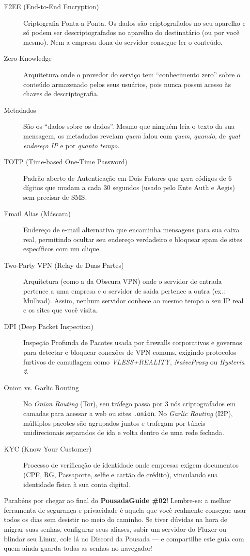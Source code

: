 \documentclass{pousadaguide}
\begin{document}
\begin{description}
  \item[E2EE (End-to-End Encryption)] Criptografia Ponta-a-Ponta. Os dados são criptografados no seu aparelho e só podem ser descriptografados no aparelho do destinatário (ou por você mesmo). Nem a empresa dona do servidor consegue ler o conteúdo.
  \item[Zero-Knowledge] Arquitetura onde o provedor do serviço tem ``conhecimento zero'' sobre o conteúdo armazenado pelos seus usuários, pois nunca possui acesso às chaves de descriptografia.
  \item[Metadados] São os ``dados sobre os dados''. Mesmo que ninguém leia o texto da sua mensagem, os metadados revelam \emph{quem} falou com \emph{quem}, \emph{quando}, de \emph{qual endereço IP} e por \emph{quanto tempo}.
  \item[TOTP (Time-based One-Time Password)] Padrão aberto de Autenticação em Dois Fatores que gera códigos de 6 dígitos que mudam a cada 30 segundos (usado pelo Ente Auth e Aegis) sem precisar de SMS.
  \item[Email Alias (Máscara)] Endereço de e-mail alternativo que encaminha mensagens para sua caixa real, permitindo ocultar seu endereço verdadeiro e bloquear spam de sites específicos com um clique.
  \item[Two-Party VPN (Relay de Duas Partes)] Arquitetura (como a da Obscura VPN) onde o servidor de entrada pertence a uma empresa e o servidor de saída pertence a outra (ex.: Mullvad). Assim, nenhum servidor conhece ao mesmo tempo o seu IP real e os sites que você visita.
  \item[DPI (Deep Packet Inspection)] Inspeção Profunda de Pacotes usada por firewalls corporativos e governos para detectar e bloquear conexões de VPN comuns, exigindo protocolos furtivos de camuflagem como \emph{VLESS+REALITY}, \emph{NaiveProxy} ou \emph{Hysteria 2}.
  \item[Onion vs. Garlic Routing] No \emph{Onion Routing} (Tor), seu tráfego passa por 3 nós criptografados em camadas para acessar a web ou sites \texttt{.onion}. No \emph{Garlic Routing} (I2P), múltiplos pacotes são agrupados juntos e trafegam por túneis unidirecionais separados de ida e volta dentro de uma rede fechada.
  \item[KYC (Know Your Customer)] Processo de verificação de identidade onde empresas exigem documentos (CPF, RG, Passaporte, selfie e cartão de crédito), vinculando sua identidade física à sua conta digital.
\end{description}

\divisor

\begin{pousadinha}
Parabéns por chegar ao final do \textbf{PousadaGuide \#02}! Lembre-se: a melhor ferramenta de segurança e privacidade é aquela que você realmente consegue usar todos os dias sem desistir no meio do caminho. Se tiver dúvidas na hora de migrar suas senhas, configurar seus aliases, subir um servidor do Fluxer ou blindar seu Linux, cole lá no Discord da Pousada — e compartilhe este guia com quem ainda guarda todas as senhas no navegador!
\end{pousadinha}

\contracapa
\end{document}

